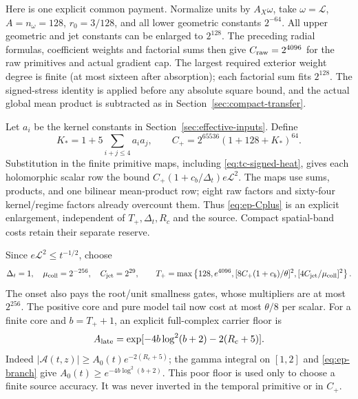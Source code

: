 Here is one explicit common payment. Normalize units by
$A_X\omega$, take $\omega=\mathcal L$, $A=n_\omega=128$,
$r_0=3/128$, and all lower geometric constants $2^{-64}$.
All upper geometric and jet constants can be enlarged to $2^{128}$.
The preceding radial formulas, coefficient weights and factorial sums
then give $C_{\rm raw}=2^{4096}$ for the raw primitives and actual
gradient cap. The largest required exterior weight degree is finite
(at most sixteen after absorption); each factorial sum fits $2^{128}$.
The signed-stress identity is applied before any absolute square bound,
and the actual global mean product is subtracted as in
Section~\ref{sec:compact-transfer}.

Let $a_i$ be the kernel constants in
Section~\ref{sec:effective-inputs}. Define
\begin{equation}
 K_*=1+5\sum_{i+j\le4}a_i a_j,\qquad
 C_+=2^{65536}(1+128+K_*)^{64}.
 \label{eq:ep-Cplus}
\end{equation}
Substitution in the finite primitive maps, including
\eqref{eq:tc-signed-heat}, gives each holomorphic scalar row the bound
$C_+(1+c_b/\Delta_t)e\mathcal L^2$.
The maps use sums, products, and one bilinear mean-product row; eight
raw factors and sixty-four kernel/regime factors already overcount them.
Thus \eqref{eq:ep-Cplus} is an explicit enlargement, independent of
$T_+,\Delta_t,R_c$ and the source. Compact spatial-band costs retain
their separate reserve.

Since $e\mathcal L^2\le t^{-1/2}$, choose
\begin{equation}
 \Delta_t=1,\quad \mu_{\rm coll}=2^{-256},\quad C_{\rm jet}=2^{29},
 \qquad
 T_+=\max\left\{128,e^{4096},
   [8C_+(1+c_b)/\theta]^2,[4C_{\rm jet}/\mu_{\rm coll}]^2\right\}.
 \label{eq:ep-Tplus}
\end{equation}
The onset also pays the root/unit smallness gates, whose multipliers
are at most $2^{256}$. The positive core and pure model tail now cost
at most $\theta/8$ per scalar. For a finite core and $b=T_++1$, an
explicit full-complex carrier floor is
\begin{equation}
 A_{\rm late}=\exp[-4b\log^2(b+2)-2(R_c+5)].
 \label{eq:ep-late-floor}
\end{equation}
Indeed $|\mathcal A(t,z)|\ge A_0(t)e^{-2(R_c+5)}$; the gamma
integral on $[1,2]$ and \eqref{eq:ep-branch} give
$A_0(t)\ge e^{-4b\log^2(b+2)}$. This poor floor is used only to
choose a finite source accuracy. It was never inverted in the temporal
primitive or in $C_+$.

